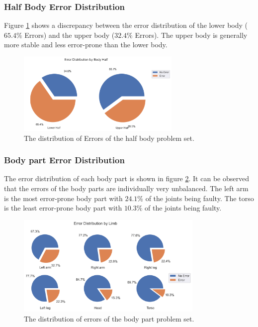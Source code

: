 \subsubsection{Half Body Error Distribution}

Figure \ref{fig:hb_pie} shows a discrepancy between the error distribution of the lower body ($65.4\%$ Errors) and the upper body ($32.4\%$ Errors). The upper body is generally more stable and less error-prone than the lower body.

\begin{figure}[ht]
  \centering
  \includegraphics[width=0.7\textwidth]{figures/Data/dist_half_body/Error_Distribution_by_Body_Half.png}
  \caption[Error Distribution by Body Half]{The distribution of Errors of the half body problem set.}
  \label{fig:hb_pie}
\end{figure}

\subsubsection{Body part Error Distribution}

The error distribution of each body part is shown in figure \ref{fig:lb_pie}. It can be observed that the errors of the body parts are individually very unbalanced. The left arm is the most error-prone body part with $24.1\%$ of the joints being faulty. The torso is the least error-prone body part with $10.3\%$ of the joints being faulty.

\begin{figure}[ht]
  \centering
  \includegraphics[width=0.8\textwidth]{figures/Data/dist_limbs/Error_Distribution_by_Limb.png}
  \caption[Error Distribution by Body part]{The distribution of errors of the body part problem set.}
  \label{fig:lb_pie}
\end{figure}


